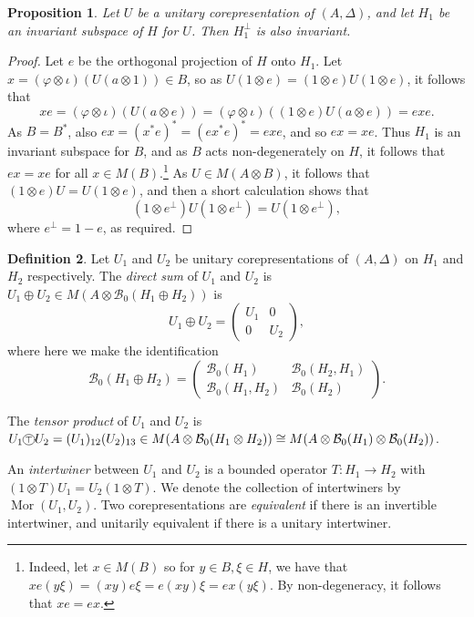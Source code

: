 \documentclass[twoside,a4paper,12pt]{article}
\theoremstyle{plain}
\newtheorem{proposition}{Proposition}[section]
\theoremstyle{definition}
\newtheorem{definition}[proposition]{Definition}
\newcommand{\mc}{\mathcal}
\newcommand{\cotp}{\xymatrix{*+<.7ex>[o][F-]{\scriptstyle\top}}}
\newcommand{\mor}{\operatorname{Mor}}
\begin{document}
\begin{proposition}
Let $U$ be a unitary corepresentation of $(A,\Delta)$, and let $H_1$ be an
invariant subspace of $H$ for $U$.  Then $H_1^\perp$ is also invariant.
\end{proposition}
\begin{proof}
Let $e$ be the orthogonal projection of $H$ onto $H_1$.  Let
$x = (\varphi\otimes\iota)(U(a\otimes 1)) \in B$, so as $U(1\otimes e)
= (1\otimes e)U(1\otimes e)$, it follows that
\[ xe = (\varphi\otimes\iota)(U(a\otimes e))
= (\varphi\otimes\iota)((1\otimes e)U(a\otimes e))
= exe. \]
As $B=B^*$, also $ex = (x^*e)^* = (ex^*e)^* = exe$, and so $ex=xe$.  Thus
$H_1$ is an invariant subspace for $B$, and as $B$ acts non-degenerately on
$H$, it follows that $ex=xe$ for all $x\in M(B)$.\footnote{Indeed, let
$x\in M(B)$ so for $y\in B,\xi\in H$, we have that $xe(y\xi) = (xy)e\xi
= e(xy)\xi = ex(y\xi)$.  By non-degeneracy, it follows that $xe=ex$.}
As $U\in M(A\otimes B)$, it follows that $(1\otimes e)U = U(1\otimes e)$,
and then a short calculation shows that
\[ (1\otimes e^\perp)U(1\otimes e^\perp) = U(1\otimes e^\perp), \]
where $e^\perp = 1-e$, as required.
\end{proof}

\begin{definition}
Let $U_1$ and $U_2$ be unitary corepresentations of $(A,\Delta)$ on 
$H_1$ and $H_2$ respectively.  The \emph{direct sum} of $U_1$ and $U_2$
is $U_1\oplus U_2 \in M(A\otimes\mc B_0(H_1\oplus H_2))$ is
\[ U_1 \oplus U_2 = \begin{pmatrix} U_1 & 0 \\ 0 & U_2 \end{pmatrix}, \]
where here we make the identification
\[ \mc B_0(H_1\oplus H_2) = \begin{pmatrix} \mc B_0(H_1) & \mc B_0(H_2,H_1) \\
\mc B_0(H_1,H_2) & \mc B_0(H_2) \end{pmatrix}. \]

The \emph{tensor product} of $U_1$ and $U_2$ is $U_1 \cotp U_2
= (U_1)_{12} (U_2)_{13} \in M(A \otimes \mc B_0(H_1\otimes H_2))
\cong M(A \otimes \mc B_0(H_1)\otimes\mc B_0(H_2))$.

An \emph{intertwiner} between $U_1$ and $U_2$ is a bounded operator
$T:H_1 \rightarrow H_2$ with $(1\otimes T)U_1 = U_2(1\otimes T)$.
We denote the collection of intertwiners by $\mor(U_1,U_2)$.  Two
corepresentations are \emph{equivalent} if there is an invertible intertwiner,
and unitarily equivalent if there is a unitary intertwiner. 
\end{definition}
\end{document}
